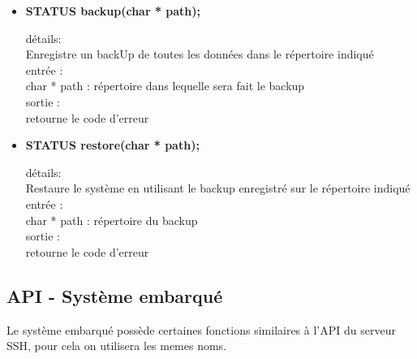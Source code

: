 \begin{itemize}
\item \textbf{STATUS backup(char * path);}
\begin{tabbing}
détails: \=\\
\>		Enregistre un backUp de toutes les données dans le répertoire indiqué\\
entrée : \\
\>		char * path : répertoire dans lequelle sera fait le backup \\
sortie : \\
\>		retourne le code d'erreur \\
\end{tabbing}

\item \textbf{STATUS restore(char * path);}
\begin{tabbing}
détails: \=\\
\>		Restaure le système en utilisant le backup enregistré sur le répertoire indiqué \\
entrée : \\
\>		char * path : répertoire du backup \\
sortie : \\
\>		retourne le code d'erreur \\
\end{tabbing}

\end{itemize}



\subsection{API - Système embarqué}

Le système embarqué possède certaines fonctions similaires à l'API du serveur 
SSH, pour cela on utilisera les memes noms.

